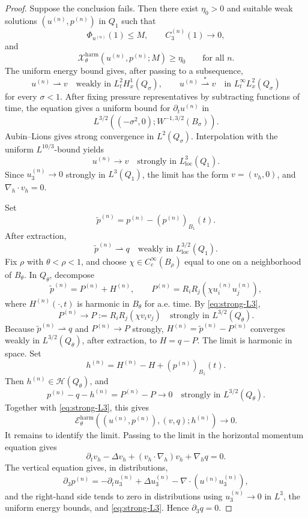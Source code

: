 \documentclass[10pt,a4paper]{amsart}
\newcommand{\calE}{\mathcal E}
\newcommand{\calH}{\mathcal H}
\newcommand{\calX}{\mathcal X}
\newcommand{\harm}{\mathrm{harm}}
\newcommand{\loc}{\mathrm{loc}}
\newcommand{\nabh}{\nabla_h}
\begin{document}
\begin{proof}
Suppose the conclusion fails.  Then there exist \(\eta_0>0\) and suitable weak solutions \((u^{(n)},p^{(n)})\) in \(Q_1\) such that
\[
        \Phi_{u^{(n)}}(1)\le M,
        \qquad
        C^{(n)}_3(1)\to0,
\]
and
\[
        \calX^{\harm}_\theta(u^{(n)},p^{(n)};M)\ge\eta_0
        \qquad\text{for all }n.
\]
The uniform energy bound gives, after passing to a subsequence,
\[
        u^{(n)}\rightharpoonup v\quad\text{weakly in }L^2_tH^1_x(Q_\sigma),
        \qquad
        u^{(n)}\stackrel{*}{\rightharpoonup} v\quad\text{in }L^\infty_tL^2_x(Q_\sigma)
\]
for every \(\sigma<1\).  After fixing pressure representatives by subtracting functions of time, the equation gives a uniform bound for \(\partial_tu^{(n)}\) in
\[
        L^{3/2}((-\sigma^2,0);W^{-1,3/2}(B_\sigma)).
\]
Aubin--Lions gives strong convergence in \(L^2(Q_\sigma)\).  Interpolation with the uniform \(L^{10/3}\)-bound yields
\begin{equation}
        u^{(n)}\to v\quad\text{strongly in }L^3_{\loc}(Q_1).
        \label{eq:strong-L3}
\end{equation}
Since \(u^{(n)}_3\to0\) strongly in \(L^3(Q_1)\), the limit has the form \(v=(v_h,0)\), and \(\nabh\cdot v_h=0\).

Set
\[
        \widetilde p^{(n)}=p^{(n)}-(p^{(n)})_{B_1}(t).
\]
After extraction,
\[
        \widetilde p^{(n)}\rightharpoonup q
        \quad\text{weakly in }L^{3/2}_{\loc}(Q_1).
\]
Fix \(\rho\) with \(\theta<\rho<1\), and choose \(\chi\in C_c^\infty(B_\rho)\) equal to one on a neighborhood of \(B_\theta\).  In \(Q_\theta\), decompose
\[
        \widetilde p^{(n)}=P^{(n)}+H^{(n)},
        \qquad
        P^{(n)}=R_iR_j(\chi u_i^{(n)}u_j^{(n)}),
\]
where \(H^{(n)}(\cdot,t)\) is harmonic in \(B_\theta\) for a.e. time.  By \eqref{eq:strong-L3},
\[
        P^{(n)}\to P:=R_iR_j(\chi v_iv_j)
        \quad\text{strongly in }L^{3/2}(Q_\theta).
\]
Because \(\widetilde p^{(n)}\rightharpoonup q\) and \(P^{(n)}\to P\) strongly, \(H^{(n)}=\widetilde p^{(n)}-P^{(n)}\) converges weakly in \(L^{3/2}(Q_\theta)\), after extraction, to \(H=q-P\).  The limit is harmonic in space.  Set
\[
        h^{(n)}=H^{(n)}-H+(p^{(n)})_{B_1}(t).
\]
Then \(h^{(n)}\in\calH(Q_\theta)\), and
\[
        p^{(n)}-q-h^{(n)}=P^{(n)}-P\to0
        \quad\text{strongly in }L^{3/2}(Q_\theta).
\]
Together with \eqref{eq:strong-L3}, this gives
\[
        \calE^{\harm}_\theta((u^{(n)},p^{(n)}),(v,q);h^{(n)})\to0.
\]
It remains to identify the limit.  Passing to the limit in the horizontal momentum equation gives
\[
        \partial_t v_h-\Delta v_h+(v_h\cdot\nabh)v_h+\nabh q=0.
\]
The vertical equation gives, in distributions,
\[
        \partial_3p^{(n)}
        =-\partial_tu^{(n)}_3+\Delta u^{(n)}_3-\nabla\cdot(u^{(n)}u^{(n)}_3),
\]
and the right-hand side tends to zero in distributions using \(u^{(n)}_3\to0\) in \(L^3\), the uniform energy bounds, and \eqref{eq:strong-L3}.  Hence \(\partial_3q=0\).


\end{proof}
\end{document}
